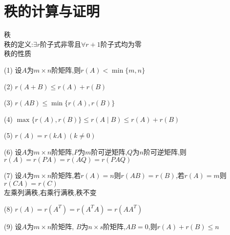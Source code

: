 \documentclass[12pt, a4paper, oneside, UTF8]{ctexbook}
\begin{document}
\section{秩的计算与证明}
\begin{remark} 秩 \\
    秩的定义:$\exists r$阶子式非零且$\forall r+1$阶子式均为零 \\
    秩的性质
    \item[(1)] 设$A$为$m\times n$阶矩阵,则$r(A)<\min\{m,n\}$
    \item[(2)] $r(A+B)\leq r(A)+r(B)$
    \item[(3)] $r(AB)\leq\min\{r(A),r(B)\}$
    \item[(4)] $\max\{r(A),r(B)\}\leq r(A\mid B)\leq r(A) + r(B)$
    \item[(5)] $r(A)=r(kA)(k\neq 0)$
    \item[(6)] 设$A$为$m\times n$阶矩阵,$P$为$m$阶可逆矩阵,$Q$为$n$阶可逆矩阵,则
    $r(A)=r(PA)=r(AQ)=r(PAQ)$
    \item[(7)] 设$A$为$m\times n$阶矩阵,若$r(A)=n$则$r(AB)=r(B)$,若$r(A)=m$则$r(CA)=r(C)$ \\
    左乘列满秩,右乘行满秩,秩不变
    \item[(8)] $r(A)=r(A^T)=r(A^TA)=r(AA^T)$
    \item[(9)] 设$A$为$m\times n$阶矩阵, $B$为$n\times s$阶矩阵,$AB=0$,则$r(A)+r(B)\leq n$
\end{remark}
\end{document}
